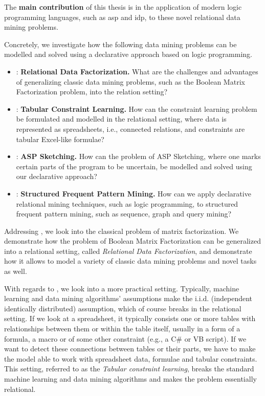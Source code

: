 The \textbf{main contribution} of this thesis is in the application of
modern logic programming languages, such as \acrshort{asp} and
\acrshort{idp}, to these novel relational data mining problems.


Concretely, we investigate how the following data mining problems
can be modelled and solved using a declarative approach based on
logic programming.
\begin{itemize}
    \item \cone: \textbf{Relational Data Factorization.} What are the challenges and advantages of generalizing
    classic data mining problems, such as the Boolean Matrix
    Factorization problem, into the relation setting?
  \item \ctwo: \textbf{Tabular Constraint Learning.} How can the constraint learning problem be formulated
   and modelled in the relational setting, where data is
   represented as spreadsheets, i.e., connected relations, and constraints are
   tabular Excel-like formulae?
  \item \cthree: \textbf{ASP Sketching.} How can the problem of ASP
      Sketching, where one marks certain parts of the
        program to be uncertain, be modelled and solved using our
        declarative approach? 
   \item \cfour: \textbf{Structured Frequent Pattern Mining.}
    How can we apply declarative relational mining
    techniques, such as logic programming, to structured frequent pattern mining, such as sequence, graph
    and query mining?
\end{itemize}

Addressing \cone, we look into the classical problem of matrix
factorization. We demonstrate how the problem of Boolean Matrix
Factorization can be generalized into  a relational setting, called
\textit{Relational Data Factorization}, and
demonstrate how it allows to model a variety of classic data mining
problems and novel tasks as well.

With regards to \ctwo, we look into a more practical setting.
Typically, machine learning and data mining algorithms' assumptions make the i.i.d.
(independent identically distributed) assumption, which of course
breaks in the relational setting. If we look at a spreadsheet, it 
typically consists one or more tables with relationships between them or
within the table itself, usually
in a form of a formula, a macro or of some other constraint (e.g., a
C\# or VB script). If we
want to detect these connections between tables or their parts, we
have to make the model able to work with spreadsheet data, 
formulae and tabular constraints. This setting, referred to as the
\textit{Tabular constraint learning}, breaks the standard
machine learning and data mining algorithms and 
makes the problem essentially relational.

